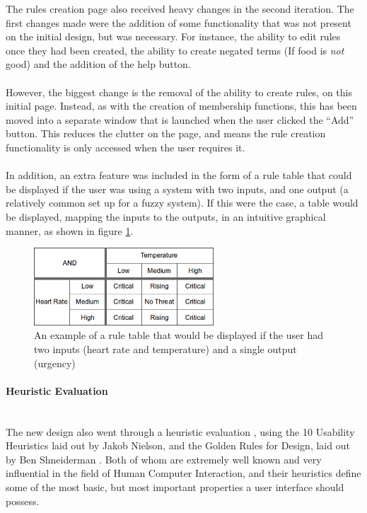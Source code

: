 The rules creation page also received heavy changes in the second iteration. The first changes made were the addition of some functionality that was not present on the initial design, but was necessary. For instance, the ability to edit rules once they had been created, the ability to create negated terms (If food is \textit{not} good) and the addition of the help button.\ \\
\ \\
However, the biggest change is the removal of the ability to create rules, on this initial page. Instead, as with the creation of membership functions, this has been moved into a separate window that is launched when the user clicked the ``Add'' button. This reduces the clutter on the page, and means the rule creation functionality is only accessed when the user requires it.\ \\
\ \\
In addition, an extra feature was included in the form of a rule table that could be displayed if the user was using a system with two inputs, and one output (a relatively common set up for a fuzzy system). If this were the case, a table would be displayed, mapping the inputs to the outputs, in an intuitive graphical manner, as shown in figure \ref{fig:ruleTable}.

\begin{figure}[ht!]
\begin{center}
\includegraphics[width=0.6\textwidth]{images/ruletable}
\end{center}
\caption{An example of a rule table that would be displayed if the user had two inputs (heart rate and temperature) and a single output (urgency)}
\label{fig:ruleTable}
\end{figure}

\paragraph{Heuristic Evaluation}\ \\
The new design also went through a heuristic evaluation \cite{nielsen1990heuristic}, using the 10 Usability Heuristics laid out by Jakob Nielson, and the Golden Rules for Design, laid out by Ben Shneiderman \cite{shneiderman2005designing}. Both of whom are extremely well known and very influential in the field of Human Computer Interaction, and their heuristics define some of the most basic, but most important properties a user interface should possess. 

